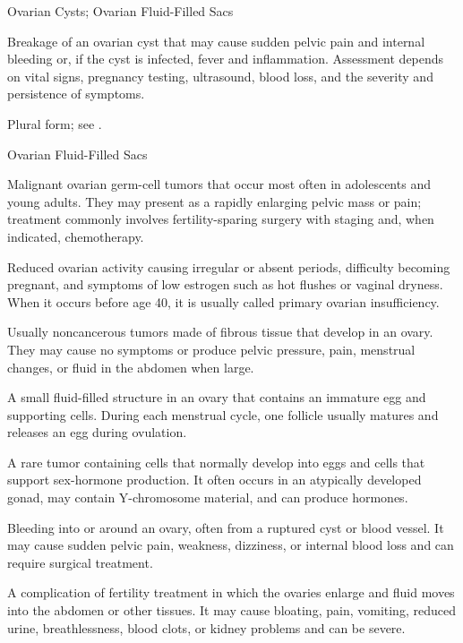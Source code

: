\synonyms
Ovarian Cysts; Ovarian Fluid-Filled Sacs

 Breakage of an ovarian cyst that may cause sudden pelvic pain and internal bleeding or, if the cyst is infected, fever and inflammation. Assessment depends on vital signs, pregnancy testing, ultrasound, blood loss, and the severity and persistence of symptoms.

 Plural form; see .

\synonyms
Ovarian Fluid-Filled Sacs

 Malignant ovarian germ-cell tumors that occur most often in adolescents and young adults. They may present as a rapidly enlarging pelvic mass or pain; treatment commonly involves fertility-sparing surgery with staging and, when indicated, chemotherapy.

 Reduced ovarian activity causing irregular or absent periods, difficulty becoming pregnant, and symptoms of low estrogen such as hot flushes or vaginal dryness. When it occurs before age 40, it is usually called primary ovarian insufficiency.

 Usually noncancerous tumors made of fibrous tissue that develop in an ovary. They may cause no symptoms or produce pelvic pressure, pain, menstrual changes, or fluid in the abdomen when large.

 A small fluid-filled structure in an ovary that contains an immature egg and supporting cells. During each menstrual cycle, one follicle usually matures and releases an egg during ovulation.

 A rare tumor containing cells that normally develop into eggs and cells that support sex-hormone production. It often occurs in an atypically developed gonad, may contain Y-chromosome material, and can produce hormones.

 Bleeding into or around an ovary, often from a ruptured cyst or blood vessel. It may cause sudden pelvic pain, weakness, dizziness, or internal blood loss and can require surgical treatment.

 A complication of fertility treatment in which the ovaries enlarge and fluid moves into the abdomen or other tissues. It may cause bloating, pain, vomiting, reduced urine, breathlessness, blood clots, or kidney problems and can be severe.

